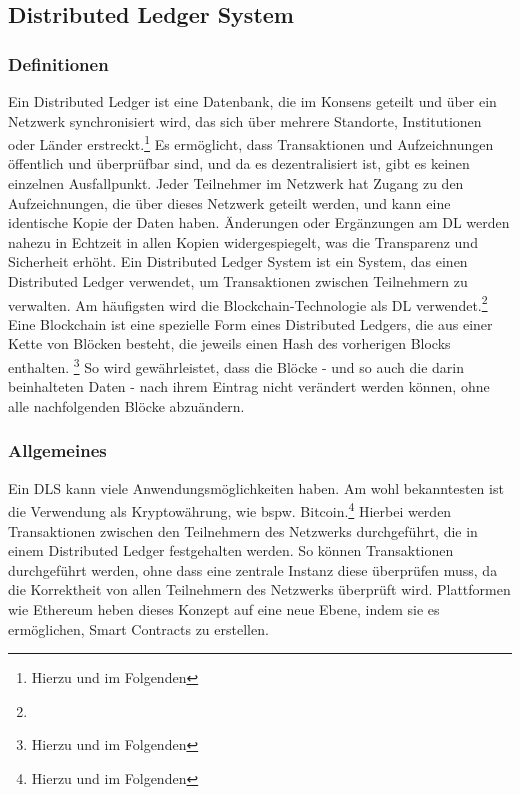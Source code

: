 \noindent

\subsection{Distributed Ledger System}
\label{sec:definition-dls}

\subsubsection{Definitionen}
Ein Distributed Ledger ist eine Datenbank, die im Konsens geteilt und über ein Netzwerk synchronisiert wird, das sich über mehrere Standorte, Institutionen oder Länder erstreckt.\footnote{
    Hierzu und im Folgenden %
} Es ermöglicht, dass Transaktionen und Aufzeichnungen öffentlich und überprüfbar sind, und da es dezentralisiert ist, gibt es keinen einzelnen Ausfallpunkt. Jeder Teilnehmer im Netzwerk hat Zugang zu den Aufzeichnungen, die über dieses Netzwerk geteilt werden, und kann eine identische Kopie der Daten haben. Änderungen oder Ergänzungen am DL werden nahezu in Echtzeit in allen Kopien widergespiegelt, was die Transparenz und Sicherheit erhöht.
\bigbreak
\noindent
Ein Distributed Ledger System ist ein System, das einen Distributed Ledger verwendet, um Transaktionen zwischen Teilnehmern zu verwalten. Am häufigsten wird die Blockchain-Technologie als DL verwendet.\footnote{
}
\bigbreak
\noindent
Eine Blockchain ist eine spezielle Form eines Distributed Ledgers, die aus einer Kette von Blöcken besteht, die jeweils einen Hash des vorherigen Blocks enthalten.
\footnote{
    Hierzu und im Folgenden %
} So wird gewährleistet, dass die Blöcke - und so auch die darin beinhalteten Daten - nach ihrem Eintrag nicht verändert werden können, ohne alle nachfolgenden Blöcke abzuändern.

\subsubsection{Allgemeines}
Ein DLS kann viele Anwendungsmöglichkeiten haben. Am wohl bekanntesten ist die Verwendung als Kryptowährung, wie bspw. Bitcoin.\footnote{
    Hierzu und im Folgenden %
} Hierbei werden Transaktionen zwischen den Teilnehmern des Netzwerks durchgeführt, die in einem Distributed Ledger festgehalten werden. So können Transaktionen durchgeführt werden, ohne dass eine zentrale Instanz diese überprüfen muss, da die Korrektheit von allen Teilnehmern des Netzwerks überprüft wird.
\bigbreak
\noindent
Plattformen wie Ethereum heben dieses Konzept auf eine neue Ebene, indem sie es ermöglichen, Smart Contracts zu erstellen.

